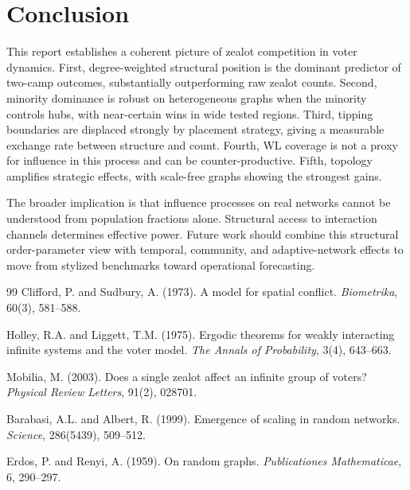 \documentclass[12pt, a4paper]{article}
\begin{document}
\section{Conclusion}
This report establishes a coherent picture of zealot competition in voter dynamics. First, degree-weighted structural position is the dominant predictor of two-camp outcomes, substantially outperforming raw zealot counts. Second, minority dominance is robust on heterogeneous graphs when the minority controls hubs, with near-certain wins in wide tested regions. Third, tipping boundaries are displaced strongly by placement strategy, giving a measurable exchange rate between structure and count. Fourth, WL coverage is not a proxy for influence in this process and can be counter-productive. Fifth, topology amplifies strategic effects, with scale-free graphs showing the strongest gains.

The broader implication is that influence processes on real networks cannot be understood from population fractions alone. Structural access to interaction channels determines effective power. Future work should combine this structural order-parameter view with temporal, community, and adaptive-network effects to move from stylized benchmarks toward operational forecasting.

\begin{thebibliography}{99}
 Clifford, P. and Sudbury, A. (1973). A model for spatial conflict. \textit{Biometrika}, 60(3), 581--588.

 Holley, R.A. and Liggett, T.M. (1975). Ergodic theorems for weakly interacting infinite systems and the voter model. \textit{The Annals of Probability}, 3(4), 643--663.

 Mobilia, M. (2003). Does a single zealot affect an infinite group of voters? \textit{Physical Review Letters}, 91(2), 028701.

 Barabasi, A.L. and Albert, R. (1999). Emergence of scaling in random networks. \textit{Science}, 286(5439), 509--512.

 Erdos, P. and Renyi, A. (1959). On random graphs. \textit{Publicationes Mathematicae}, 6, 290--297.
\end{thebibliography}

\end{document}
